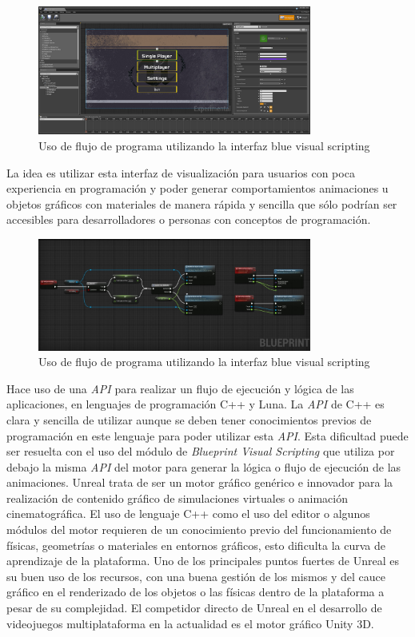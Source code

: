 \documentclass[a4paper]{book}
\begin{document}
\begin{figure}[H]
    \centering
    \includegraphics[width=9cm, keepaspectratio]{img/menu_unreal.png}
    \caption{Uso de flujo de programa utilizando la interfaz blue visual scripting}
    \label{menu_unreal}
\end{figure}

La idea es utilizar esta interfaz de visualización para usuarios con poca experiencia en programación
y poder generar comportamientos animaciones u objetos gráficos con materiales de manera rápida y
sencilla que sólo podrían ser accesibles para desarrolladores o personas con conceptos de programación.

\begin{figure}[H]
    \centering
    \includegraphics[width=9cm, keepaspectratio]{img/option1_unreal.jpg}
    \caption{Uso de flujo de programa utilizando la interfaz blue visual scripting}
    \label{option1_unreal}
\end{figure}

Hace uso de una \textit{API} para realizar un flujo de ejecución y lógica de las aplicaciones, en lenguajes de
programación C++ y Luna. La \textit{API} de C++ es clara y sencilla de utilizar aunque se deben tener conocimientos
previos de programación en este lenguaje para poder utilizar esta \textit{API}. Esta dificultad puede ser resuelta
con el uso del módulo de  \textit{Blueprint Visual Scripting} que utiliza por debajo la misma \textit{API} del motor para
generar la lógica o flujo de ejecución de las animaciones. Unreal trata de ser un motor gráfico genérico e innovador
para la realización de contenido gráfico de simulaciones virtuales o animación cinematográfica. El uso de lenguaje C++
como el uso del editor o algunos módulos del motor requieren de un conocimiento previo del funcionamiento de físicas, geometrías
o materiales en entornos gráficos, esto dificulta la curva de aprendizaje de la plataforma. Uno de los principales puntos
fuertes de Unreal es su buen uso de los recursos, con una buena gestión de los mismos y del cauce gráfico en el
renderizado de los objetos o las físicas dentro de la plataforma a pesar de su complejidad. El competidor directo de Unreal
en el desarrollo de videojuegos multiplataforma en la actualidad es el motor gráfico Unity 3D.
\end{document}

